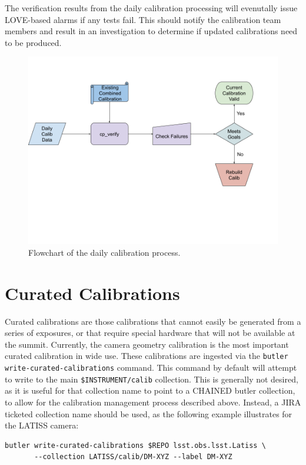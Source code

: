 \documentclass[DM,authoryear,toc]{lsstdoc}
\begin{document}
The verification results from the daily calibration processing will evenutally issue LOVE-based alarms if any tests fail.
This should notify the calibration team members and result in an investigation to determine if updated calibrations need to be produced.

\begin{figure}
  \includegraphics[width=\linewidth]{figures/daily_processing.png}
  \caption{Flowchart of the daily calibration process.}
  \label{fig:daily}
\end{figure}

\section{Curated Calibrations}

Curated calibrations are those calibrations that cannot easily be generated from a series of exposures, or that require special hardware that will not be available at the summit.
Currently, the camera geometry calibration is the most important curated calibration in wide use.
These calibrations are ingested via the \verb|butler write-curated-calibrations| command.
This command by default will attempt to write to the main \verb|$INSTRUMENT/calib| collection.
This is generally not desired, as it is useful for that collection name to point to a CHAINED butler collection, to allow for the calibration management process described above.
Instead, a JIRA ticketed collection name should be used, as the following example illustrates for the LATISS camera:
\begin{verbatim}
butler write-curated-calibrations $REPO lsst.obs.lsst.Latiss \
       --collection LATISS/calib/DM-XYZ --label DM-XYZ
\end{verbatim}
\end{document}
